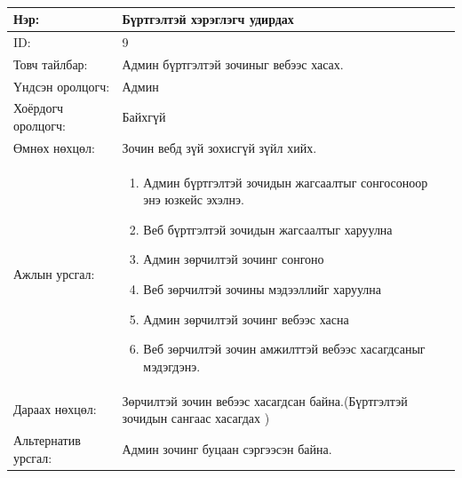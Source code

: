 \begin{center}
	\begin{table}[!htbp]
		\caption{}
		\begin{tabular}{|p{4cm}|p{11cm}|}
			\hline
			Нэр: & Бүртгэлтэй хэрэглэгч удирдах  \\
			\hline
			ID: & 9 \\
			\hline
			Товч тайлбар: & Админ бүртгэлтэй зочиныг вебээс хасах.  \\
			\hline
			Үндсэн оролцогч: & Админ \\
			\hline
			Хоёрдогч оролцогч: & Байхгүй  \\
			\hline
			Өмнөх нөхцөл: &  Зочин вебд зүй зохисгүй зүйл хийх. \\
			\hline
			Ажлын урсгал: & \begin{enumerate}
								\item Админ бүртгэлтэй зочидын жагсаалтыг сонгосоноор энэ юзкейс эхэлнэ.
								\item Веб бүртгэлтэй зочидын жагсаалтыг харуулна
								\item Админ зөрчилтэй зочинг сонгоно
								\item Веб зөрчилтэй зочины мэдээллийг харуулна
								\item Админ зөрчилтэй зочинг вебээс хасна
								\item Веб зөрчилтэй зочин амжилттэй вебээс хасагдсаныг мэдэгдэнэ.
							\end{enumerate}	\\
						\hline
			Дараах нөхцөл: & Зөрчилтэй зочин вебээс хасагдсан байна.(Бүртгэлтэй зочидын сангаас хасагдах ) \\
			\hline
			Альтернатив урсгал: & Админ зочинг буцаан сэргээсэн байна. \\
			\hline
		\end{tabular}
	\end{table}
\end{center}

